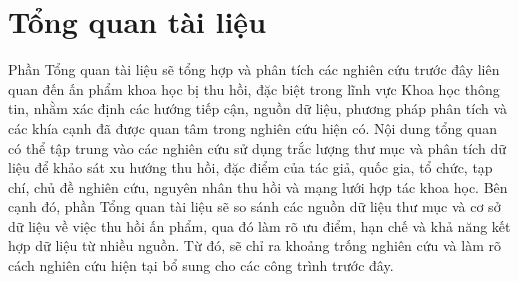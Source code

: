 \section{Tổng quan tài liệu}

Phần Tổng quan tài liệu sẽ tổng hợp và phân tích các nghiên cứu trước đây liên quan đến ấn phẩm khoa học bị thu hồi, đặc biệt trong lĩnh vực Khoa học thông tin, nhằm xác định các hướng tiếp cận, nguồn dữ liệu, phương pháp phân tích và các khía cạnh đã được quan tâm trong nghiên cứu hiện có. Nội dung tổng quan có thể tập trung vào các nghiên cứu sử dụng trắc lượng thư mục và phân tích dữ liệu để khảo sát xu hướng thu hồi, đặc điểm của tác giả, quốc gia, tổ chức, tạp chí, chủ đề nghiên cứu, nguyên nhân thu hồi và mạng lưới hợp tác khoa học. Bên cạnh đó, phần Tổng quan tài liệu sẽ so sánh các nguồn dữ liệu thư mục và cơ sở dữ liệu về việc thu hồi ấn phẩm, qua đó làm rõ ưu điểm, hạn chế và khả năng kết hợp dữ liệu từ nhiều nguồn. Từ đó, sẽ chỉ ra khoảng trống nghiên cứu và làm rõ cách nghiên cứu hiện tại bổ sung cho các công trình trước đây.